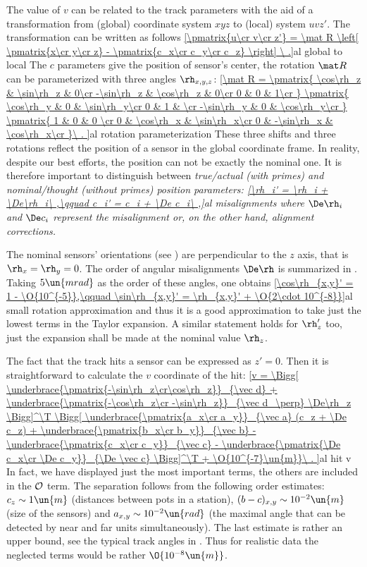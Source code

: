 The value of $v$ can be related to the track parameters with the aid of a transformation from (global) coordinate system $xyz$ to (local) system $uvz'$. The transformation can be written as follows
\eqref{\pmatrix{u\cr v\cr z'} = \mat R \left[ \pmatrix{x\cr y\cr z}  - \pmatrix{c_x\cr c_y\cr c_z}  \right] \ .}{al global to local}
The $c$ parameters give the position of sensor's center, the rotation $\mat R$ can be parameterized with three angles $\rh_{x,y,z}$:
\eqref{\mat R =
	\pmatrix{
		\cos\rh_z  & \sin\rh_z & 0\cr
		-\sin\rh_z & \cos\rh_z & 0\cr
		0		   & 0         & 1\cr
	}
	\pmatrix{
		\cos\rh_y  & 0 & \sin\rh_y\cr
		0		   & 1 &          \cr
		-\sin\rh_y & 0 & \cos\rh_y\cr
	}
	\pmatrix{
		1 & 0		   & 0        \cr
		0 & \cos\rh_x  & \sin\rh_x\cr
		0 & -\sin\rh_x & \cos\rh_x\cr
	}\ .
}{al rotation parameterization}
These three shifts and three rotations reflect the position of a sensor in the global coordinate frame. In reality, despite our best efforts, the position can not be exactly the nominal one. It is therefore important to distinguish between \em{true/actual} (with primes) and \em{nominal/thought} (without primes) position parameters:
\eqref{\rh_i' = \rh_i + \De\rh_i\ ,\qquad c_i' = c_i + \De c_i\ ,}{al misalignments}
where $\De\rh_i$ and $\De c_i$ represent the \em{misalignment} or, on the other hand, \em{alignment corrections}.

The nominal sensors' orientations (see ) are perpendicular to the $z$ axis, that is $\rh_x=\rh_y=0$. The order of angular misalignments $\De\rh$ is summarized in . Taking $5\un{mrad}$ as the order of these angles, one obtains
\eqref{\cos\rh_{x,y}' = 1 - \O{10^{-5}},\qquad \sin\rh_{x,y}' = \rh_{x,y}' + \O{2\cdot 10^{-8}}}{al small rotation approximation}
and thus it is a good approximation to take just the lowest terms in the Taylor expansion. A similar statement holds for $\rh_z'$ too, just the expansion shall be made at the nominal value $\rh_z$.

The fact that the track  hits a sensor can be expressed as $z' = 0$. Then it is straightforward to calculate the $v$ coordinate of the hit:
\eqref{v =
	\Bigg[
		\underbrace{\pmatrix{-\sin\rh_z\cr\cos\rh_z}}_{\vec d}
		+ \underbrace{\pmatrix{-\cos\rh_z\cr -\sin\rh_z}}_{\vec d_\perp} \De\rh_z
	\Bigg]^\T
	\Bigg[
		\underbrace{\pmatrix{a_x\cr a_y}}_{\vec a} (c_z + \De c_z)
		 + \underbrace{\pmatrix{b_x\cr b_y}}_{\vec b}
		 - \underbrace{\pmatrix{c_x\cr c_y}}_{\vec c}
		 - \underbrace{\pmatrix{\De c_x\cr \De c_y}}_{\De \vec c}
	\Bigg]^\T
	+ \O{10^{-7}\un{m}}\ .
}{al hit v}
In fact, we have displayed just the most important terms, the others are included in the $\cal O$ term. The separation follows from the following order estimates: $c_z \sim 1\un{m}$ (distances between pots in a station), $(b - c)_{x, y} \sim 10^{-2}\un{m}$ (size of the sensors) and $a_{x, y} \sim 10^{-2}\un{rad}$ (the maximal angle that can be detected by near and far units simultaneously). The last estimate is rather an upper bound, see the typical track angles in . Thus for realistic data the neglected terms would be rather $\O{10^{-8}\un{m}}$.

